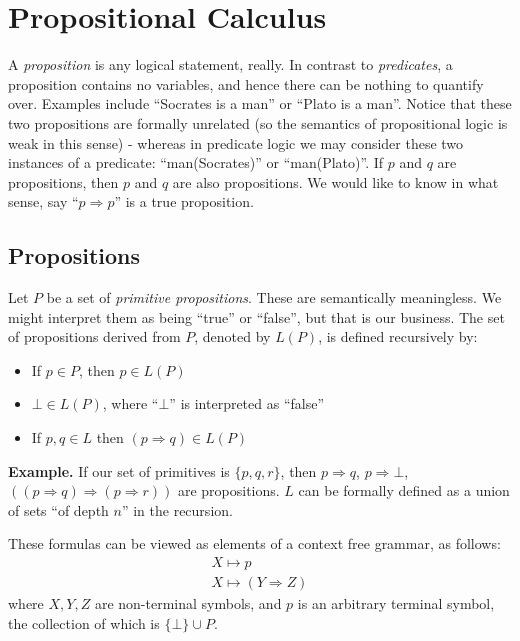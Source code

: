 \documentclass{article}
\theoremstyle{definition}
\numberwithin{definition}{section}
\begin{document}
\section{Propositional Calculus} 
A \textit{proposition} is any logical statement, really. In contrast to 
\textit{predicates}, a proposition contains no variables, and hence there can 
be nothing to quantify over. Examples include ``Socrates is a man'' or 
``Plato is a man''. Notice that these two propositions are formally unrelated 
(so the semantics of propositional logic is weak in this sense) - whereas in 
predicate logic we may consider these two instances of a predicate: 
``man(Socrates)'' or ``man(Plato)''. If $p$ and $q$ are propositions, then 
$p$ and $q$ are also propositions. We would like to know in what sense, say 
``$p \Rightarrow p$'' is a true proposition. 

\subsection{Propositions} 
Let $P$ be a set of \textit{primitive propositions}. These are semantically 
meaningless. We might interpret them as being ``true'' or ``false'', but that 
is our business. The set of propositions derived from $P$, denoted by $L(P)$, 
is defined recursively by:

\begin{itemize}
\item If $p \in P$, then $p \in L(P)$ 
\item $\bot \in L(P)$, where ``$\bot$'' is interpreted as ``false''
\item If $p,q \in L$ then $(p \Rightarrow q) \in L(P)$
\end{itemize}

\textbf{Example.} If our set of primitives is $\{p,q,r\}$, then 
$p \Rightarrow q$, $p \Rightarrow \bot$, 
$((p \Rightarrow q) \Rightarrow (p \Rightarrow r))$ are propositions. 
$L$ can be formally defined as a union of sets ``of depth $n$'' in the 
recursion. 

These formulas can be viewed as elements of a context free grammar, as follows:
\begin{align*}
X \mapsto p \\
X \mapsto (Y \Rightarrow Z)
\end{align*}
where $X,Y,Z$ are non-terminal symbols, and $p$ is an arbitrary terminal symbol, the 
collection of which is $\{\bot\} \cup P$. 
\end{document}
